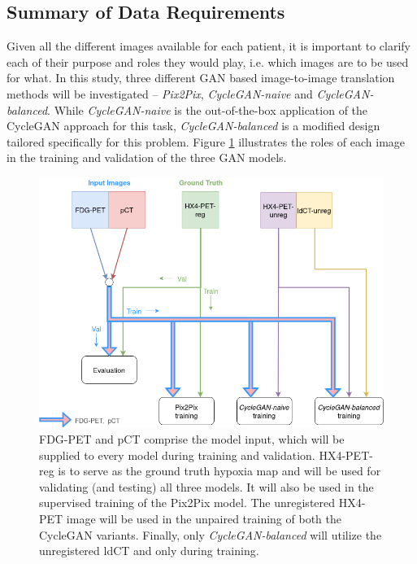 \subsection{Summary of Data Requirements}
\label{data_requirements}
Given all the different images available for each patient, it is important to clarify each of their purpose and roles they would play, i.e. which images are to be used for what. In this study, three different GAN based image-to-image translation methods will be investigated -- \textit{Pix2Pix}, \textit{CycleGAN-naive} and \textit{CycleGAN-balanced}. While \textit{CycleGAN-naive} is the out-of-the-box application of the CycleGAN approach for this task, \textit{CycleGAN-balanced} is a modified design tailored specifically for this problem. Figure \ref{fig:which_images_where} illustrates the roles of each image in the training and validation of the three GAN models.


\begin{figure}[h!]
    \centering
    \includegraphics[width=0.95\linewidth]{figures/Data/which_images_where.png}
    \caption{FDG-PET and pCT comprise the model input, which will be supplied to every model during training and validation. HX4-PET-reg is to serve as the ground truth hypoxia map and will be used for validating (and testing) all three models. It will also be used in the supervised training of the Pix2Pix model. The unregistered HX4-PET image will be used in the unpaired training of both the CycleGAN variants. Finally, only \textit{CycleGAN-balanced} will utilize the unregistered ldCT and only during training.}
    \label{fig:which_images_where}
\end{figure}


